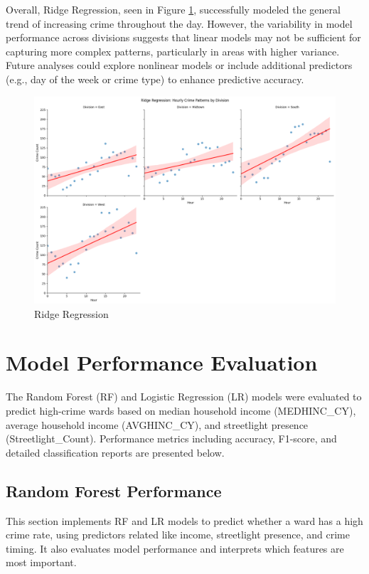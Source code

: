 \documentclass{report}
\begin{document}
Overall, Ridge Regression, seen in Figure \ref{fig:ridge-reg}, successfully modeled the general trend of increasing crime throughout the day. However, the variability in model performance across divisions suggests that linear models may not be sufficient for capturing more complex patterns, particularly in areas with higher variance. Future analyses could explore nonlinear models or include additional predictors (e.g., day of the week or crime type) to enhance predictive accuracy.

\begin{figure}[htbp]
  \centering
  \includegraphics[width=1.0\textwidth]{ridge-reg.png}
  \caption{Ridge Regression}
  \label{fig:ridge-reg}
\end{figure}

\newpage
\section{Model Performance Evaluation}
\par The Random Forest (RF) and Logistic Regression (LR) models were evaluated to predict high-crime wards based on median household income (MEDHINC\_CY), average household income (AVGHINC\_CY), and streetlight presence (Streetlight\_Count). Performance metrics including accuracy, F1-score, and detailed classification reports are presented below.

\subsection{Random Forest Performance}
\par This section implements RF and LR models to predict whether a ward has a high crime rate, using predictors related like income, streetlight presence, and crime timing. It also evaluates model performance and interprets which features are most important.
\end{document}
